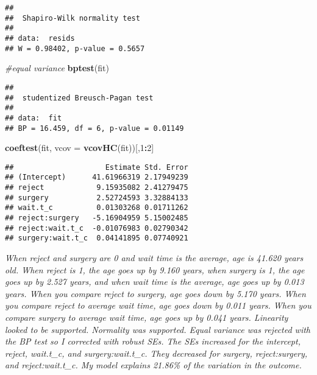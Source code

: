 \documentclass[]{article}
\newenvironment{Shaded}{\begin{snugshade}}{\end{snugshade}}
\newcommand{\CommentTok}[1]{\textcolor[rgb]{0.56,0.35,0.01}{\textit{#1}}}
\newcommand{\DataTypeTok}[1]{\textcolor[rgb]{0.13,0.29,0.53}{#1}}
\newcommand{\DecValTok}[1]{\textcolor[rgb]{0.00,0.00,0.81}{#1}}
\newcommand{\KeywordTok}[1]{\textcolor[rgb]{0.13,0.29,0.53}{\textbf{#1}}}
\newcommand{\NormalTok}[1]{#1}
\newcommand{\OperatorTok}[1]{\textcolor[rgb]{0.81,0.36,0.00}{\textbf{#1}}}
\begin{document}
\begin{verbatim}
## 
##  Shapiro-Wilk normality test
## 
## data:  resids
## W = 0.98402, p-value = 0.5657
\end{verbatim}

\begin{Shaded}
\begin{Highlighting}[]
\CommentTok{#equal variance}
\KeywordTok{bptest}\NormalTok{(fit)}
\end{Highlighting}
\end{Shaded}

\begin{verbatim}
## 
##  studentized Breusch-Pagan test
## 
## data:  fit
## BP = 16.459, df = 6, p-value = 0.01149
\end{verbatim}

\begin{Shaded}
\begin{Highlighting}[]
\KeywordTok{coeftest}\NormalTok{(fit, }\DataTypeTok{vcov =} \KeywordTok{vcovHC}\NormalTok{(fit))[,}\DecValTok{1}\OperatorTok{:}\DecValTok{2}\NormalTok{] }
\end{Highlighting}
\end{Shaded}

\begin{verbatim}
##                     Estimate Std. Error
## (Intercept)      41.61966319 2.17949239
## reject            9.15935082 2.41279475
## surgery           2.52724593 3.32884133
## wait.t_c          0.01303268 0.01711262
## reject:surgery   -5.16904959 5.15002485
## reject:wait.t_c  -0.01076983 0.02790342
## surgery:wait.t_c  0.04141895 0.07740921
\end{verbatim}

\emph{When reject and surgery are 0 and wait time is the average, age is
41.620 years old. When reject is 1, the age goes up by 9.160 years, when
surgery is 1, the age goes up by 2.527 years, and when wait time is the
average, age goes up by 0.013 years. When you compare reject to surgery,
age goes down by 5.170 years. When you compare reject to average wait
time, age goes down by 0.011 years. When you compare surgery to average
wait time, age goes up by 0.041 years. Linearity looked to be supported.
Normality was supported. Equal variance was rejected with the BP test so
I corrected with robust SEs. The SEs increased for the intercept,
reject, wait.t\_c, and surgery:wait.t\_c. They decreased for surgery,
reject:surgery, and reject:wait.t\_c. My model explains 21.86\% of the
variation in the outcome.}
\end{document}
